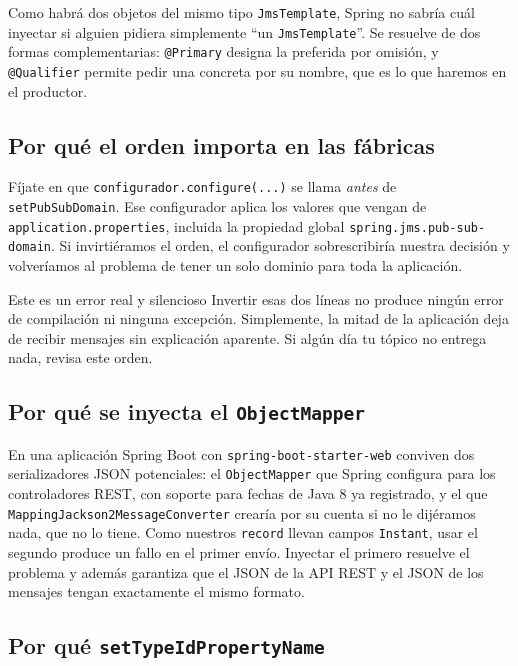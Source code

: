 \documentclass[11pt,a4paper]{book}
\newcommand{\clase}[1]{\texttt{#1}}
\newcommand{\ruta}[1]{\texttt{#1}}
\begin{document}
Como habrá dos objetos del mismo tipo \clase{JmsTemplate}, Spring no sabría cuál inyectar si alguien pidiera simplemente ``un \clase{JmsTemplate}''.
Se resuelve de dos formas complementarias: \texttt{@Primary} designa la preferida por omisión, y \texttt{@Qualifier} permite pedir una concreta por su nombre, que es lo que haremos en el productor.

\subsection{Por qué el orden importa en las fábricas}

Fíjate en que \texttt{configurador.configure(...)} se llama \emph{antes} de \texttt{setPubSubDomain}.
Ese configurador aplica los valores que vengan de \ruta{application.properties}, incluida la propiedad global \texttt{spring.jms.pub-sub-domain}.
Si invirtiéramos el orden, el configurador sobrescribiría nuestra decisión y volveríamos al problema de tener un solo dominio para toda la aplicación.

\begin{cajaAviso}{Este es un error real y silencioso}
	Invertir esas dos líneas no produce ningún error de compilación ni ninguna excepción.
	Simplemente, la mitad de la aplicación deja de recibir mensajes sin explicación aparente.
	Si algún día tu tópico no entrega nada, revisa este orden.
\end{cajaAviso}

\subsection{Por qué se inyecta el \clase{ObjectMapper}}

En una aplicación Spring Boot con \texttt{spring-boot-starter-web} conviven dos serializadores JSON potenciales: el \clase{ObjectMapper} que Spring configura para los controladores REST, con soporte para fechas de Java 8 ya registrado, y el que \clase{MappingJackson2MessageConverter} crearía por su cuenta si no le dijéramos nada, que no lo tiene.
Como nuestros \clase{record} llevan campos \clase{Instant}, usar el segundo produce un fallo en el primer envío.
Inyectar el primero resuelve el problema y además garantiza que el JSON de la API REST y el JSON de los mensajes tengan exactamente el mismo formato.

\subsection{Por qué \texttt{setTypeIdPropertyName}}
\end{document}
